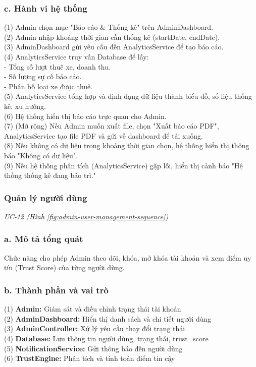 \subsubsection*{c. Hành vi hệ thống}
(1) Admin chọn mục "Báo cáo \& Thống kê" trên AdminDashboard. \\
(2) Admin nhập khoảng thời gian cần thống kê (startDate, endDate). \\
(3) AdminDashboard gửi yêu cầu đến AnalyticsService để tạo báo cáo. \\
(4) AnalyticsService truy vấn Database để lấy: \\
\quad - Tổng số lượt thuê xe, doanh thu. \\
\quad - Số lượng sự cố báo cáo. \\
\quad - Phân bố loại xe được thuê. \\
(5) AnalyticsService tổng hợp và định dạng dữ liệu thành biểu đồ, số liệu thống kê, xu hướng. \\
(6) Hệ thống hiển thị báo cáo trực quan cho Admin. \\
(7) (Mở rộng) Nếu Admin muốn xuất file, chọn "Xuất báo cáo PDF", AnalyticsService tạo file PDF và gửi về dashboard để tải xuống. \\
(8) Nếu không có dữ liệu trong khoảng thời gian chọn, hệ thống hiển thị thông báo "Không có dữ liệu". \\
(9) Nếu hệ thống phân tích (AnalyticsService) gặp lỗi, hiển thị cảnh báo "Hệ thống thống kê đang bảo trì."
\subsubsection{Quản lý người dùng}
\small\textit{UC-12 (Hình \ref{fig:admin-user-management-sequence})}
\subsubsection*{a. Mô tả tổng quát}
Chức năng cho phép Admin theo dõi, khóa, mở khóa tài khoản và xem điểm uy tín (Trust Score) của từng người dùng.
\subsubsection*{b. Thành phần và vai trò}
(1) \textbf{Admin:} Giám sát và điều chỉnh trạng thái tài khoản \\
(2) \textbf{AdminDashboard:} Hiển thị danh sách và chi tiết người dùng \\
(3) \textbf{AdminController:} Xử lý yêu cầu thay đổi trạng thái \\
(4) \textbf{Database:} Lưu thông tin người dùng, trạng thái, trust\_score \\
(5) \textbf{NotificationService:} Gửi thông báo đến người dùng \\
(6) \textbf{TrustEngine:} Phân tích và tính toán điểm tin cậy
